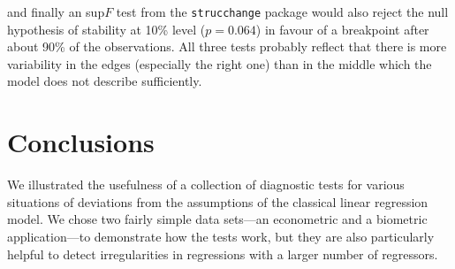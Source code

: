 \documentclass[a4paper]{article}
\begin{document}
and finally an sup$F$ test from the \texttt{strucchange} package would also reject the
null hypothesis of stability at 10\% level ($p = 0.064$)
in favour of a breakpoint after about 90\% of the
observations. All three
tests probably reflect that there is more variability in the edges (especially the
right one) than in the middle which the model does not describe sufficiently.

\section{Conclusions} \label{sec:conclusions}

We illustrated the usefulness of a collection of diagnostic tests for various
situations of deviations from the assumptions of the classical linear regression
model. We chose two fairly simple data sets---an econometric and a biometric
application---to demonstrate how the tests work, but they are also particularly
helpful to detect irregularities in regressions with a larger number of regressors.



\end{document}
